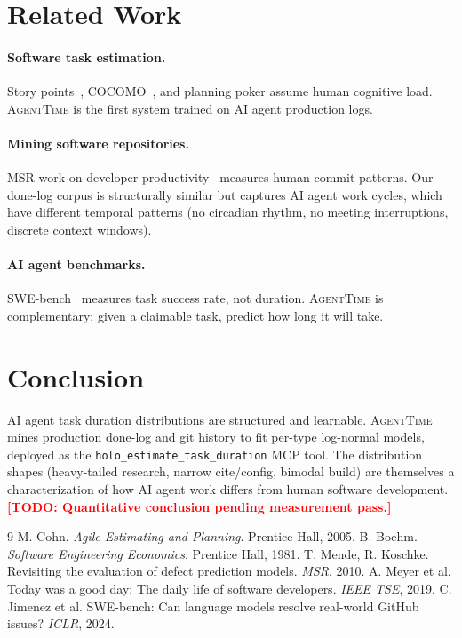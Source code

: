 \documentclass[sigconf]{acmart}
\newcommand{\todo}[1]{\textcolor{red}{\textbf{[TODO: #1]}}}
\newcommand{\agenttime}{\textsc{AgentTime}}
\begin{document}
\section{Related Work}

\paragraph{Software task estimation.}
Story points~\cite{cohn2005}, COCOMO~\cite{boehm1981}, and
planning poker assume human cognitive load.
\agenttime{} is the first system trained on AI agent production logs.

\paragraph{Mining software repositories.}
MSR work on developer productivity~\cite{meyer2019} measures human
commit patterns. Our done-log corpus is structurally similar but
captures AI agent work cycles, which have different temporal patterns
(no circadian rhythm, no meeting interruptions, discrete context windows).

\paragraph{AI agent benchmarks.}
SWE-bench~\cite{jimenez2024} measures task success rate, not duration.
\agenttime{} is complementary: given a claimable task, predict how
long it will take.

\section{Conclusion}

AI agent task duration distributions are structured and learnable.
\agenttime{} mines production done-log and git history to fit per-type
log-normal models, deployed as the \texttt{holo\_estimate\_task\_duration}
MCP tool.
The distribution shapes (heavy-tailed research, narrow cite/config, bimodal
build) are themselves a characterization of how AI agent work differs from
human software development.
\todo{Quantitative conclusion pending measurement pass.}




\begin{thebibliography}{9}
 M. Cohn. {\em Agile Estimating and Planning}. Prentice Hall, 2005.
 B. Boehm. {\em Software Engineering Economics}. Prentice Hall, 1981.
 T. Mende, R. Koschke. Revisiting the evaluation of defect prediction models. {\em MSR}, 2010.
 A. Meyer et al. Today was a good day: The daily life of software developers. {\em IEEE TSE}, 2019.
 C. Jimenez et al. SWE-bench: Can language models resolve real-world GitHub issues? {\em ICLR}, 2024.
\end{thebibliography}
\end{document}
